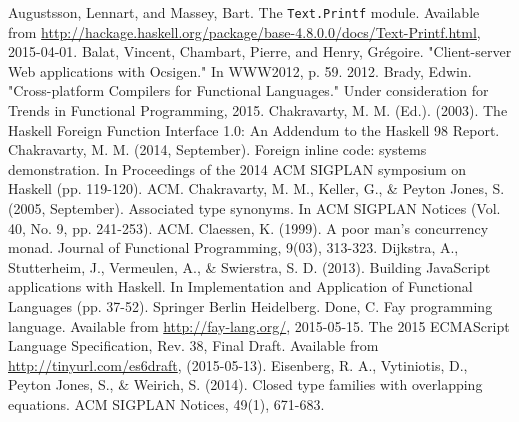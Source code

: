 \documentclass[preprint]{sigplanconf}
\begin{document}




\begin{thebibliography}{}
\softraggedright

  Augustsson, Lennart, and Massey, Bart. The {\tt Text.Printf} module.
  Available from \url{http://hackage.haskell.org/package/base-4.8.0.0/docs/Text-Printf.html},
  2015-04-01.
  Balat, Vincent, Chambart, Pierre, and Henry, Grégoire.
  "Client-server Web applications with Ocsigen." In WWW2012, p. 59. 2012.
  Brady, Edwin.
  "Cross-platform Compilers for Functional Languages."
  Under consideration for Trends in Functional Programming, 2015.
  Chakravarty, M. M. (Ed.). (2003).
  The Haskell Foreign Function Interface 1.0: An Addendum to the Haskell 98
  Report.
  Chakravarty, M. M. (2014, September).
  Foreign inline code: systems demonstration.
  In Proceedings of the 2014 ACM SIGPLAN symposium on Haskell (pp. 119-120).
  ACM.
  Chakravarty, M. M., Keller, G., \& Peyton Jones, S. (2005, September).
  Associated type synonyms.
  In ACM SIGPLAN Notices (Vol. 40, No. 9, pp. 241-253). ACM.
  Claessen, K. (1999).
  A poor man's concurrency monad.
  Journal of Functional Programming, 9(03), 313-323.
  Dijkstra, A., Stutterheim, J., Vermeulen, A., \& Swierstra, S. D. (2013).
  Building JavaScript applications with Haskell.
  In Implementation and Application of Functional Languages (pp. 37-52).
  Springer Berlin Heidelberg.
  Done, C.
  Fay programming language.
  Available from \url{http://fay-lang.org/}, 2015-05-15.
  The 2015 ECMAScript Language Specification, Rev. 38, Final Draft.
  Available from \url{http://tinyurl.com/es6draft},
  (2015-05-13).
  Eisenberg, R. A., Vytiniotis, D., Peyton Jones, S., \& Weirich, S. (2014).
  Closed type families with overlapping equations.
  ACM SIGPLAN Notices, 49(1), 671-683.

\end{thebibliography}
\end{document}

